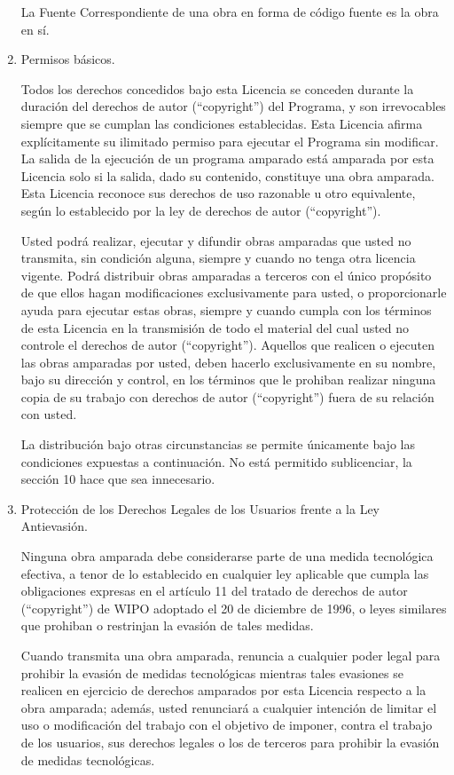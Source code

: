 \documentclass[11pt]{article}
\begin{document}
\begin{enumerate}
La Fuente Correspondiente de una obra en forma de c\'{o}digo fuente es la obra en s\'{i}.

\item Permisos b\'{a}sicos.

Todos los derechos concedidos bajo esta Licencia se conceden durante la duraci\'{o}n del derechos de autor (``copyright'') del Programa, y son irrevocables siempre que se cumplan las condiciones establecidas. Esta Licencia afirma expl\'{i}citamente su ilimitado permiso para ejecutar el Programa sin modificar. La salida de la ejecuci\'{o}n de un programa amparado est\'{a} amparada por esta Licencia solo si la salida, dado su contenido, constituye una obra amparada. Esta Licencia reconoce sus derechos de uso razonable u otro equivalente, seg\'{u}n lo establecido por la ley de derechos de autor (``copyright'').

Usted podr\'{a} realizar, ejecutar y difundir obras amparadas que usted no transmita, sin condici\'{o}n alguna, siempre y cuando no tenga otra licencia vigente. Podr\'{a} distribuir obras amparadas a terceros con el \'{u}nico prop\'{o}sito de que ellos hagan modificaciones exclusivamente para usted, o proporcionarle ayuda para ejecutar estas obras, siempre y cuando cumpla con los t\'{e}rminos de esta Licencia en la transmisi\'{o}n de todo el material del cual usted no controle el derechos de autor (``copyright''). Aquellos que realicen o ejecuten las obras amparadas por usted, deben hacerlo exclusivamente en su nombre, bajo su direcci\'{o}n y control, en los t\'{e}rminos que le prohiban realizar ninguna copia de su trabajo con derechos de autor (``copyright'') fuera de su relaci\'{o}n con usted.

La distribuci\'{o}n bajo otras circunstancias se permite \'{u}nicamente bajo las condiciones expuestas a  continuaci\'{o}n. No est\'{a} permitido sublicenciar, la secci\'{o}n 10 hace que sea innecesario.

\item Protecci\'{o}n de los Derechos Legales de los Usuarios frente a la 
Ley Antievasi\'{o}n.

Ninguna obra amparada debe considerarse parte de una medida tecnol\'{o}gica 
efectiva, a tenor de lo establecido en cualquier ley aplicable que cumpla 
las obligaciones expresas en el art\'{i}culo 11 del tratado de derechos de autor (``copyright'') de WIPO 
adoptado el 20 de diciembre de 1996, o leyes similares que prohiban o 
restrinjan la evasi\'{o}n de tales medidas.

Cuando transmita una obra amparada, renuncia a cualquier poder legal 
para prohibir la evasi\'{o}n de medidas tecnol\'{o}gicas mientras tales evasiones 
se realicen en ejercicio de derechos amparados por esta Licencia respecto 
a la obra amparada; adem\'{a}s, usted renunciar\'{a} a cualquier intenci\'{o}n de 
limitar el uso o modificaci\'{o}n del trabajo con el objetivo de imponer, 
contra el trabajo de los usuarios, sus derechos legales o los de terceros 
para prohibir la evasi\'{o}n de medidas tecnol\'{o}gicas.


\end{enumerate}
\end{document}
